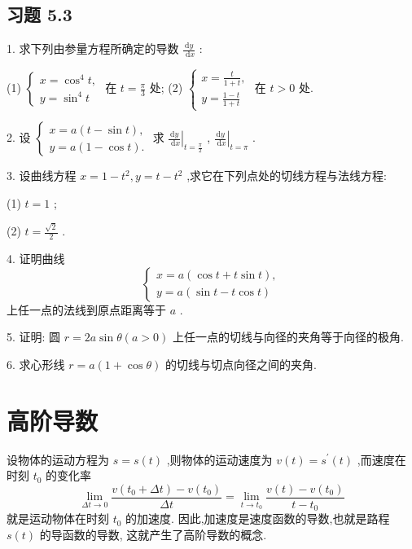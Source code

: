 \subsection{习题 5.3}

1. 求下列由参量方程所确定的导数 \(\frac{\mathrm{d}y}{\mathrm{\;d}x}\) :

(1) \(\left\{  \begin{array}{l} x = {\cos }^{4}t, \\  y = {\sin }^{4}t \end{array}\right.\) 在 \(t = \frac{\pi }{3}\) 处; (2) \(\left\{  \begin{array}{l} x = \frac{t}{1 + t}, \\  y = \frac{1 - t}{1 + t} \end{array}\right.\) 在 \(t > 0\) 处.

2. 设 \(\left\{  {\begin{array}{l} x = a\left( {t - \sin t}\right) , \\  y = a\left( {1 - \cos t}\right) . \end{array}\text{ 求 }{\left. \frac{\mathrm{d}y}{\mathrm{\;d}x}\right| }_{t = \frac{\pi }{2}}}\right.\) , \({\left. \frac{\mathrm{d}y}{\mathrm{\;d}x}\right| }_{t = \pi }\) .

3. 设曲线方程 \(x = 1 - {t}^{2},y = t - {t}^{2}\) ,求它在下列点处的切线方程与法线方程:

(1) \(t = 1\) ;

(2) \(t = \frac{\sqrt{2}}{2}\) .

4. 证明曲线
\[
\left\{  \begin{array}{l} x = a\left( {\cos t + t\sin t}\right) , \\  y = a\left( {\sin t - t\cos t}\right)  \end{array}\right.
\]
上任一点的法线到原点距离等于 \(a\) .

5. 证明: 圆 \(r = {2a}\sin \theta \left( {a > 0}\right)\) 上任一点的切线与向径的夹角等于向径的极角.

6. 求心形线 \(r = a\left( {1 + \cos \theta }\right)\) 的切线与切点向径之间的夹角.

\section{高阶导数}

设物体的运动方程为 \(s = s\left( t\right)\) ,则物体的运动速度为 \(v\left( t\right)  = {s}^{\prime }\left( t\right)\) ,而速度在时刻 \({t}_{0}\) 的变化率
\[
\mathop{\lim }\limits_{{{\Delta t} \rightarrow  0}}\frac{v\left( {{t}_{0} + {\Delta t}}\right)  - v\left( {t}_{0}\right) }{\Delta t} = \mathop{\lim }\limits_{{t \rightarrow  {t}_{0}}}\frac{v\left( t\right)  - v\left( {t}_{0}\right) }{t - {t}_{0}}
\]
就是运动物体在时刻 \({t}_{0}\) 的加速度. 因此,加速度是速度函数的导数,也就是路程 \(s\left( t\right)\) 的导函数的导数, 这就产生了高阶导数的概念.

